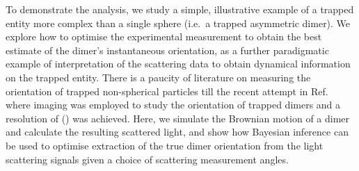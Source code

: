 \documentclass[final, 3p]{elsarticle}
\begin{document}
To demonstrate the analysis, we study a simple, illustrative example
of a trapped entity more complex than a single sphere (i.e.\ a trapped
asymmetric dimer).  We explore how to optimise the experimental
measurement to obtain the best estimate of the dimer's instantaneous
orientation, as a further paradigmatic example of interpretation of
the scattering data to obtain dynamical information on the trapped
entity.  There is a paucity of literature on measuring the orientation
of trapped non-spherical particles till the recent attempt in
Ref.~\cite{raudsepp2022estimating} where imaging was employed to
study the orientation of trapped dimers and a resolution of () was
achieved.  Here, we simulate the Brownian motion of a dimer and
calculate the resulting scattered light, and show how Bayesian
inference can be used to optimise extraction of the true dimer
orientation from the light scattering signals given a choice of
scattering measurement angles.
\end{document}
